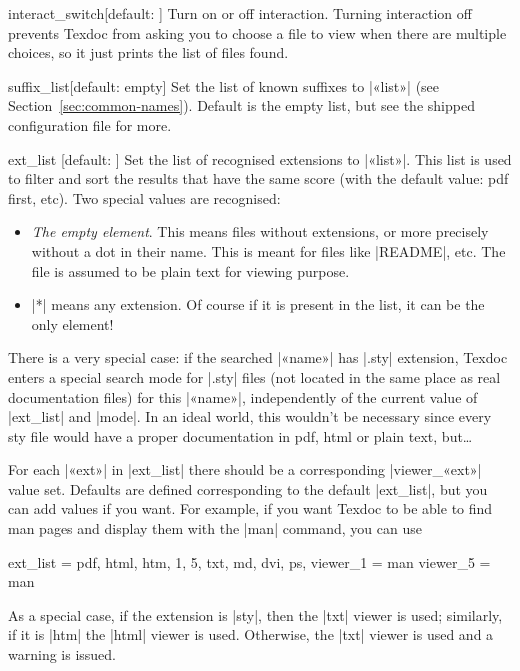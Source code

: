 \documentclass[draft]{texdoc-doc}
\begin{document}
\begin{confitem}{interact\_switch}{}[default: ]
Turn on or off interaction. Turning interaction off prevents Texdoc from asking
you to choose a file to view when there are multiple choices, so it just prints
the list of files found.
\end{confitem}

\begin{confitem}{suffix\_list}{}[default: empty]
Set the list of known suffixes to |«list»| (see
Section~\ref{sec:common-names}). Default is the empty list, but see the
shipped configuration file for more.
\end{confitem}

\begin{confitem}{ext\_list}
  {}[default: ]
Set the list of recognised extensions to |«list»|. This list is used to filter
and  sort the results that have the same score (with the default value: pdf
first, etc). Two special values are recognised:
%
\begin{itemize}
\item \emph{The empty element}. This means files without extensions, or more
  precisely without a dot in their name. This is meant for files like
  |README|, etc. The file is assumed to be plain text for viewing purpose.
\item |*| means any extension. Of course if it is present in the list, it
  can be the only element!
\end{itemize}

There is a very special case: if the searched |«name»| has |.sty| extension,
Texdoc enters a special search mode for |.sty| files (not located in the same
place as real documentation files) for this |«name»|, independently of the
current value of |ext_list| and |mode|. In an ideal world, this wouldn't be
necessary since every sty file would have a proper documentation in pdf, html
or plain text, but\dots

For each |«ext»| in |ext_list| there should be a corresponding |viewer_«ext»|
value set. Defaults are defined corresponding to the default |ext_list|, but
you can add values if you want. For example, if you want Texdoc to be able
to find man pages and display them with the |man| command, you can use
%
\begin{htcode}
ext_list = pdf, html, htm, 1, 5, txt, md, dvi, ps,
viewer_1 = man
viewer_5 = man
\end{htcode}

As a special case, if the extension is |sty|, then the |txt| viewer is used;
similarly, if it is |htm| the |html| viewer is used. Otherwise, the |txt|
viewer is used and a warning is issued.
\end{confitem}
\end{document}
